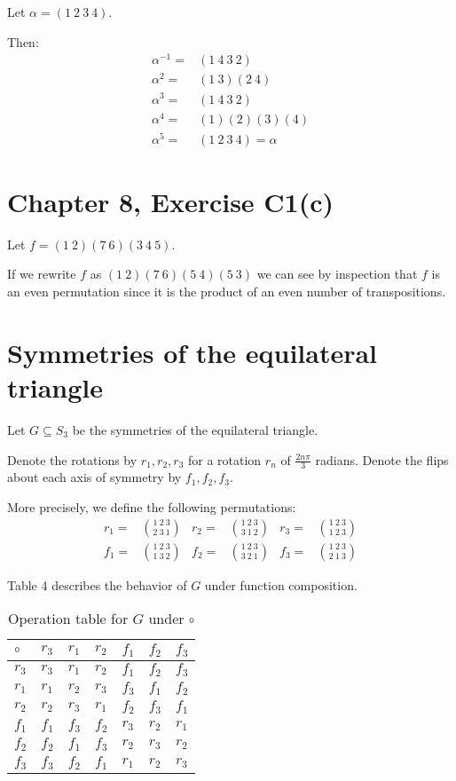 \documentclass[12pt]{article}
\begin{document}
Let $\alpha = (1\ 2\ 3\ 4)$.

Then:
\begin{align}
	\alpha^{-1} = & (1\ 4\ 3\ 2) \\
	\alpha^2 = & (1\ 3)(2\ 4) \\
	\alpha^3 = & (1\ 4\ 3\ 2) \\
	\alpha^4 = & (1)(2)(3)(4) \\
	\alpha^5 = & (1\ 2\ 3\ 4) = \alpha
\end{align}

\section{Chapter 8, Exercise C1(c)}

Let $f = (1\ 2)(7\ 6)(3\ 4\ 5)$.

If we rewrite $f$ as $(1\ 2)(7\ 6)(5\ 4)(5\ 3)$
we can see by inspection
that $f$ is an even permutation
since it is the product of an even number
of transpositions.

\section{Symmetries of the equilateral triangle}

Let $G \subseteq S_3$ be the symmetries of the equilateral triangle.

Denote the rotations by $r_1, r_2, r_3$ for a rotation $r_n$ of $\frac{2 n\pi}{3}$ radians.
Denote the flips about each axis of symmetry by $f_1, f_2, f_3$.

More precisely, we define the following permutations:
\begin{align}
	r_1 = & \binom{1\ 2\ 3}{2\ 3\ 1} &
	r_2 = & \binom{1\ 2\ 3}{3\ 1\ 2} &
	r_3 = & \binom{1\ 2\ 3}{1\ 2\ 3} \\
	f_1 = & \binom{1\ 2\ 3}{1\ 3\ 2} &
	f_2 = & \binom{1\ 2\ 3}{3\ 2\ 1} &
	f_3 = & \binom{1\ 2\ 3}{2\ 1\ 3}
\end{align}


Table 4 describes the behavior of $G$ under function composition.

\begin{table}[!ht] 
\begin{tabular}{l|llllll}
	$\circ$ & $r_3$ & $r_1$ & $r_2$ & $f_1$ & $f_2$ & $f_3$	\\ \hline
	$r_3$ & $r_3$ & $r_1$ & $r_2$ & $f_1$ & $f_2$ & $f_3$   \\
	$r_1$ & $r_1$ & $r_2$ & $r_3$ & $f_3$ & $f_1$ & $f_2$ 	\\
	$r_2$ & $r_2$ & $r_3$ & $r_1$ & $f_2$ & $f_3$ & $f_1$ 	\\
	$f_1$ & $f_1$ & $f_3$ & $f_2$ & $r_3$ & $r_2$ & $r_1$ 	\\
	$f_2$ & $f_2$ & $f_1$ & $f_3$ & $r_2$ & $r_3$ & $r_2$ 	\\
	$f_3$ & $f_3$ & $f_2$ & $f_1$ & $r_1$ & $r_2$ & $r_3$	\\
\end{tabular}
\centering
\caption{Operation table for $G$ under $\circ$}
\label{t4}
\end{table}
\end{document}
